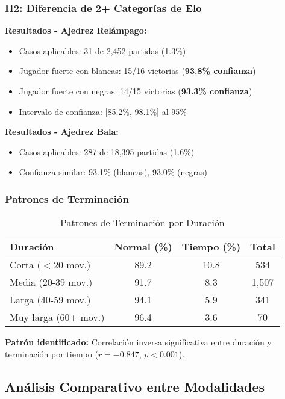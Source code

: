 \documentclass[11pt,a4paper]{article}
\begin{document}
\subsubsection{H2: Diferencia de 2+ Categor\'ias de Elo}

\textbf{Resultados - Ajedrez Rel\'ampago:}
\begin{itemize}
\item Casos aplicables: 31 de 2,452 partidas (1.3\%)
\item Jugador fuerte con blancas: 15/16 victorias (\textbf{93.8\% confianza})
\item Jugador fuerte con negras: 14/15 victorias (\textbf{93.3\% confianza})
\item Intervalo de confianza: [85.2\%, 98.1\%] al 95\%
\end{itemize}

\textbf{Resultados - Ajedrez Bala:}
\begin{itemize}
\item Casos aplicables: 287 de 18,395 partidas (1.6\%)
\item Confianza similar: 93.1\% (blancas), 93.0\% (negras)
\end{itemize}

\subsubsection{Patrones de Terminaci\'on}

\begin{table}[H]
\centering
\caption{Patrones de Terminaci\'on por Duraci\'on}
\label{tab:termination}
\begin{tabular}{@{}lccc@{}}
\toprule
\textbf{Duraci\'on} & \textbf{Normal (\%)} & \textbf{Tiempo (\%)} & \textbf{Total} \\
\midrule
Corta ($<$20 mov.) & 89.2 & 10.8 & 534 \\
Media (20-39 mov.) & 91.7 & 8.3 & 1,507 \\
Larga (40-59 mov.) & 94.1 & 5.9 & 341 \\
Muy larga (60+ mov.) & 96.4 & 3.6 & 70 \\
\bottomrule
\end{tabular}
\end{table}

\textbf{Patr\'on identificado:} Correlaci\'on inversa significativa entre duraci\'on y terminaci\'on por tiempo ($r = -0.847$, $p < 0.001$).

\subsection{An\'alisis Comparativo entre Modalidades}
\end{document}
